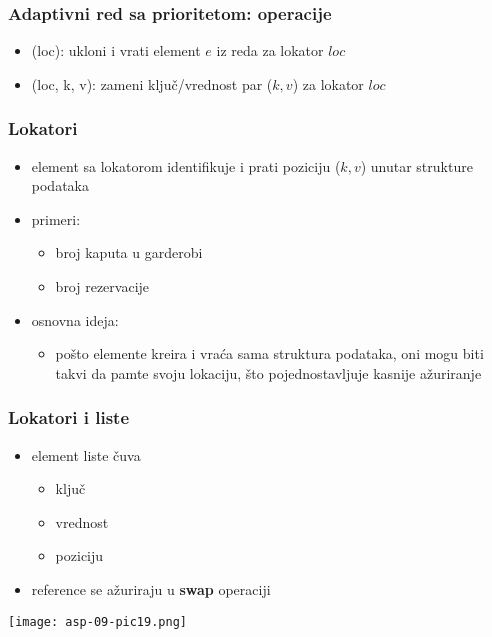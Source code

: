\documentclass[compress]{beamer}
\begin{document}
\begin{frame}[fragile]
  \frametitle{Adaptivni red sa prioritetom: operacije}
  \begin{itemize}
    \item {}(loc): ukloni i vrati element $e$ iz reda za lokator
    $loc$
    \item {}(loc, k, v): zameni ključ/vrednost par ($k, v$) za
    lokator $loc$
  \end{itemize}
\end{frame}

\begin{frame}[fragile]
  \frametitle{Lokatori}
  \begin{itemize}
    \item element sa lokatorom identifikuje i prati poziciju ($k, v$) unutar
    strukture podataka
    \item primeri:
    \begin{itemize}
      \item broj kaputa u garderobi
      \item broj rezervacije 
    \end{itemize}
    \item osnovna ideja:
    \begin{itemize}
      \item pošto elemente kreira i vraća sama struktura podataka, oni mogu biti
      takvi da pamte svoju lokaciju, što pojednostavljuje kasnije ažuriranje
    \end{itemize}
  \end{itemize}
\end{frame}

\begin{frame}[fragile]
  \frametitle{Lokatori i liste}
  \begin{itemize}
    \item element liste čuva
    \begin{itemize}
      \item ključ
      \item vrednost
      \item poziciju 
    \end{itemize}
    \item reference se ažuriraju u \textbf{swap} operaciji
  \end{itemize}
  \begin{center}
    \texttt{[image: asp-09-pic19.png]}
  \end{center}
\end{frame}
\end{document}
